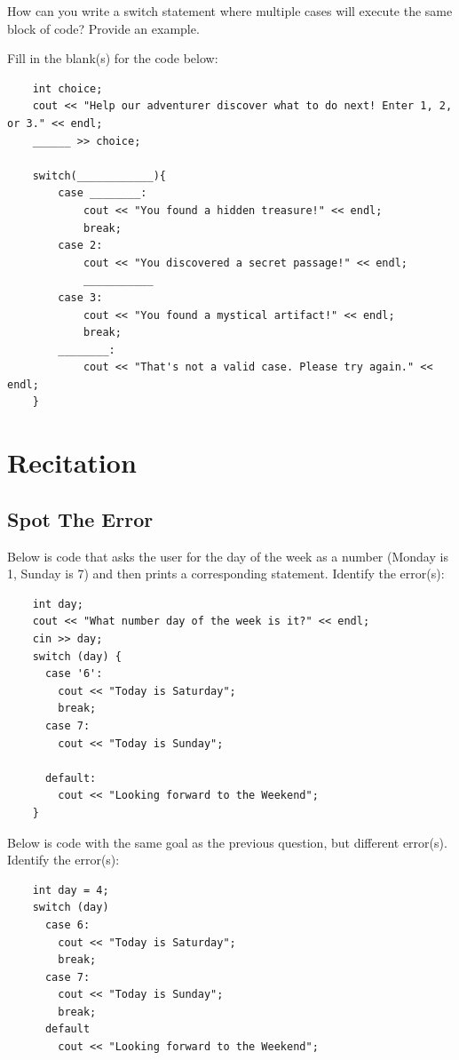 \begin{problem}
    How can you write a switch statement where multiple cases will execute the same block of code? Provide an example.
\end{problem}

\vspace{5cm}

\begin{problem}
    Fill in the blank(s) for the code below:
    \begin{verbatim}
    int choice;
    cout << "Help our adventurer discover what to do next! Enter 1, 2, or 3." << endl;
    ______ >> choice;

    switch(____________){
        case ________:
            cout << "You found a hidden treasure!" << endl;
            break;
        case 2:
            cout << "You discovered a secret passage!" << endl;
            ___________
        case 3:
            cout << "You found a mystical artifact!" << endl;
            break;
        ________:
            cout << "That's not a valid case. Please try again." << endl;
    }
    \end{verbatim}
\end{problem}



\section{Recitation}

\subsection{Spot The Error}

\begin{multipart}
Below is code that asks the user for the day of the week as a number (Monday is 1, Sunday is 7) and then prints a corresponding statement. Identify the error(s):
\begin{verbatim}
    int day;
    cout << "What number day of the week is it?" << endl;
    cin >> day;
    switch (day) {
      case '6':
        cout << "Today is Saturday";
        break;
      case 7:
        cout << "Today is Sunday";
        
      default:
        cout << "Looking forward to the Weekend";
    }
\end{verbatim}

\end{multipart}

\begin{multipart}
    Below is code with the same goal as the previous question, but different error(s). Identify the error(s):
    \begin{verbatim}
    int day = 4;
    switch (day) 
      case 6:
        cout << "Today is Saturday";
        break;
      case 7:
        cout << "Today is Sunday";
        break;
      default
        cout << "Looking forward to the Weekend";
        
    \end{verbatim}
\end{multipart}

